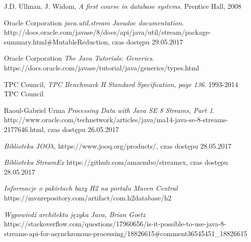 \documentclass[12pt]{extarticle}
\begin{document}
\begin{thebibliography}{9}

        J.D. Ullman, J. Widom,
        \textit{A first course in database systems}. 
        Prentice Hall, 2008

        Oracle Corporation
        \textit{java.util.stream Javadoc documentation}. 
        http://docs.oracle.com/javase/8/docs/api/java/util/stream/package-summary.html\#MutableReduction, czas dostępu 29.05.2017

        Oracle Corporation
        \textit{The Java Tutorials: Generics}. 
        https://docs.oracle.com/javase/tutorial/java/generics/types.html

        TPC Council,
        \textit{TPC Benchmark H Standard Specification, page 136}. 
        1993-2014 TPC Council

        Raoul-Gabriel Urma
        \textit{Processing Data with Java SE 8 Streams, Part 1}. 
        http://www.oracle.com/technetwork/articles/java/ma14-java-se-8-streams-2177646.html, czas dostępu 26.05.2017

        \textit{Biblioteka JOO$\lambda$}, https://www.jooq.org/products/, czas dostępu 28.05.2017

        \textit{Biblioteka StreamEx} https://github.com/amaembo/streamex, czas dostępu 28.05.2017

        \textit{Informacje o pakietach bazy H2 na portalu Maven Central} https://mvnrepository.com/artifact/com.h2database/h2

        \textit{Wypowiedź architekta języka Java, Brian Goetz}
        https://stackoverflow.com/questions/17960656/is-it-possible-to-use-java-8-streams-api-for-asynchronous-processing/18826615\#comment36545451\_18826615

\end{thebibliography}
\end{document}

